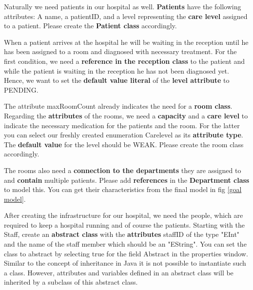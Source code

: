 Naturally we need patients in our hospital as well. \textbf{Patients} have the following attributes: A  \textsf{name}, a \textsf{patientID,} and a \textsf{level} representing the \textbf{care level} assigned to a patient.
Please create the \textbf{Patient class} accordingly.\newline

When a patient arrives at the hospital he will be waiting in the reception until he has been assigned to a room and diagnosed with necessary treatment. For the first condition, we need a \textbf{reference in the reception class} to the patient and while the patient is waiting in the reception he has not been diagnosed yet. Hence, we want to set the \textbf{default value literal} of the \textbf{level attribute} to \textsf{PENDING}.\newline

The attribute \textsf{maxRoomCount} already indicates the need for a \textbf{room class}. Regarding the \textbf{attributes} of the rooms, we need a \textbf{capacity} and a \textbf{care level} to indicate the necessary medication for the patients and the room.
For the latter you can select our freshly created enumeration \textsf{Carelevel} as its \textbf{attribute type}. The \textbf{default value} for the level should be \textsf{WEAK}.
Please create the room class accordingly.\newline

The rooms also need a \textbf{connection to the departments} they are assigned to and \textbf{contain} multiple patients. Please add \textbf{references} in the \textbf{Department class} to model this. You can get their characteristics from the final model in fig \ref{goal model}.\newline

After creating the infrastructure for our hospital, we need the people, which are required to keep a hospital running and of course the patients. Starting with the Staff, create an \textbf{abstract class} with the \textbf{attributes} \textsf{staffID} of the type "EInt" and the \textsf{name} of the staff member which should be an "EString". You can set the class to abstract by selecting \textsf{true} for the field \textsf{Abstract} in the properties window.\newline
Similar to the concept of inheritance in Java it is not possible to instantiate such a class. However, attributes and variables defined in an abstract class will be inherited by a subclass of this abstract class.\newline

